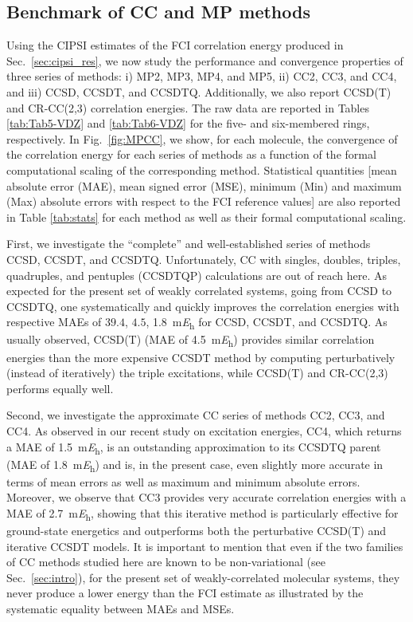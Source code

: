 \documentclass[aip,jcp,reprint,noshowkeys,superscriptaddress,floatfix]{revtex4-1}
\begin{document}
\subsection{Benchmark of CC and MP methods}
\label{sec:mpcc_res}

Using the CIPSI estimates of the FCI correlation energy produced in Sec.~\ref{sec:cipsi_res}, we now study the performance and convergence properties of three series of methods: i) MP2, MP3, MP4, and MP5, ii) CC2, CC3, and CC4, and iii) CCSD, CCSDT, and CCSDTQ.
Additionally, we also report CCSD(T) and CR-CC(2,3) correlation energies.
The raw data are reported in Tables \ref{tab:Tab5-VDZ} and \ref{tab:Tab6-VDZ} for the five- and six-membered rings, respectively. 
In Fig.~\ref{fig:MPCC}, we show, for each molecule, the convergence of the correlation energy for each series of methods as a function of the formal computational scaling of the corresponding method.
Statistical quantities [mean absolute error (MAE), mean signed error (MSE), minimum (Min) and maximum (Max) absolute errors with respect to the FCI reference values] are also reported in Table \ref{tab:stats} for each method as well as their formal computational scaling. 

First, we investigate the ``complete'' and well-established series of methods CCSD, CCSDT, and CCSDTQ.
Unfortunately, CC with singles, doubles, triples, quadruples, and pentuples (CCSDTQP) calculations are out of reach here. \cite{Hirata_2000,Kallay_2001}
As expected for the present set of weakly correlated systems, going from CCSD to CCSDTQ, one systematically and quickly improves the correlation energies with respective MAEs of $39.4$, $4.5$, \SI{1.8}{\milli\hartree} for CCSD, CCSDT, and CCSDTQ.
As usually observed, CCSD(T) (MAE of \SI{4.5}{\milli\hartree}) provides similar correlation energies than the more expensive CCSDT method by computing perturbatively (instead of iteratively) the triple excitations, while CCSD(T) and CR-CC(2,3) performs equally well.

Second, we investigate the approximate CC series of methods CC2, CC3, and CC4.
As observed in our recent study on excitation energies, \cite{Loos_2021} CC4, which returns a MAE of \SI{1.5}{\milli\hartree}, is an outstanding approximation to its CCSDTQ parent (MAE of \SI{1.8}{\milli\hartree}) and is, in the present case, even slightly more accurate in terms of mean errors as well as maximum and minimum absolute errors.
Moreover, we observe that CC3 provides very accurate correlation energies with a MAE of \SI{2.7}{\milli\hartree}, showing that this iterative method is particularly effective for ground-state energetics and outperforms both the perturbative CCSD(T) and iterative CCSDT models.
It is important to mention that even if the two families of CC methods studied here are known to be non-variational (see Sec.~\ref{sec:intro}), for the present set of weakly-correlated molecular systems, they never produce a lower energy than the FCI estimate as illustrated by the systematic equality between MAEs and MSEs.
\end{document}

